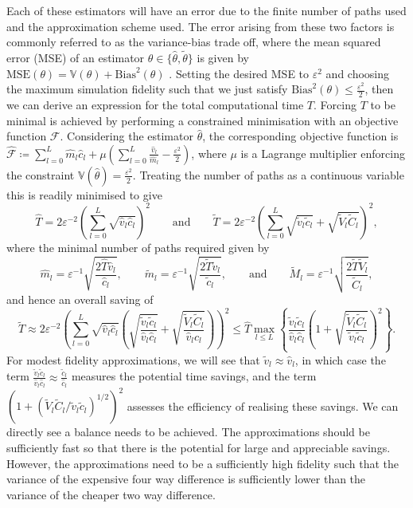 \documentclass[manuscript,review]{acmart}
\begin{document}
Each of these estimators will have an error due to the finite number of paths used and the approximation scheme used. The error arising from these two factors is commonly referred to as the variance-bias trade off, where the mean squared error (MSE) of an estimator $ \theta \in \{\hat{\theta}, \tilde{\theta}\} $ is given by $ \text{MSE}(\theta) = \mathbb{V}(\theta) + \text{Bias}^2(\theta)$ \citep[page~16]{glasserman2013monte}. Setting the desired MSE to $ \varepsilon^2 $ and choosing the maximum simulation fidelity such that we just satisfy $ \text{Bias}^2(\theta) \leq \tfrac{\varepsilon^2}{2} $, then we can derive an expression for the total computational time $ T $. Forcing $ T $ to be minimal is achieved by performing a constrained minimisation with an objective function $ \mathscr{F} $. Considering the estimator $ \hat{\theta} $, the corresponding objective function is $ \hat{\mathscr{F}} \coloneqq \sum_{l=0}^{L} \hat{m}_l \hat{c}_l + \mu (\sum_{l=0}^{L} \tfrac{\hat{v}_l}{\hat{m}_l} - \tfrac{\varepsilon^2}{2}) $, where $ \mu $ is a Lagrange multiplier enforcing the constraint $ \mathbb{V}(\hat{\theta}) = \tfrac{\varepsilon^2}{2} $. Treating the number of paths as a continuous variable this is readily minimised to give
\begin{equation*}
\hat{T} = 2\varepsilon^{-2}\left(\sum_{l=0}^L \sqrt{\hat{v}_l \hat{c}_l}\right)^2 
\qquad \text{and} \qquad 
\tilde{T} = 2\varepsilon^{-2} \left(\sum_{l=0}^L \sqrt{\tilde{v}_l \tilde{c}_l} + \sqrt{\tilde{V}_l \tilde{C}_l}\right)^2,
\end{equation*}
where the minimal number of paths required given by
\begin{equation*}
\hat{m}_l = \varepsilon^{-1} \sqrt{\dfrac{2\hat{T}\hat{v}_l}{\hat{c}_l}},
\qquad 
\tilde{m}_l  = \varepsilon^{-1} \sqrt{\dfrac{2\tilde{T} \tilde{v}_l}{\tilde{c}_l}}, 
\qquad 
\text{and}
\qquad 
\tilde{M}_l  = \varepsilon^{-1} \sqrt{\dfrac{2\tilde{T} \tilde{V}_l}{\tilde{C}_l}},
\end{equation*}
and hence an overall saving of
\begin{equation*}
\tilde{T} 
\approx 2\varepsilon^{-2} \left(\sum_{l=0}^L \sqrt{\hat{v}_l \hat{c}_l} \left( \sqrt{\dfrac{\tilde{v}_l\tilde{c}_l}{\hat{v}_l\hat{c}_l}} + \sqrt{\dfrac{\tilde{V}_l \tilde{C}_l}{\hat{v}_l \hat{c}_l}}\right)\right)^2 
\leq \hat{T} \max_{l \leq L} \left\{ \dfrac{\tilde{v}_l\tilde{c}_l}{\hat{v}_l\hat{c}_l} \left(1 + \sqrt{\dfrac{\tilde{V}_l \tilde{C}_l}{\tilde{v}_l \tilde{c}_l}}\right)^2\right\}.
\end{equation*}
For modest fidelity approximations, we will see that $ \tilde{v}_l \approx \hat{v}_l $, in which case the term $ \tfrac{\tilde{v}_l\tilde{c}_l}{\hat{v}_l\hat{c}_l} \approx \tfrac{\tilde{c}_l}{\hat{c}_l}$ measures the potential time savings, and the term $ (1 + (\tilde{V}_l \tilde{C}_l / \tilde{v}_l \tilde{c}_l)^{1/2})^2 $ assesses the efficiency of realising these savings. We can directly see a balance needs to be achieved. The approximations should be sufficiently fast so that there is the potential for large and appreciable savings. However, the approximations need to be a sufficiently high fidelity such that the variance of the expensive four way difference is sufficiently lower than the variance of the cheaper two way difference.
\end{document}
